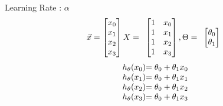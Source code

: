  Learning Rate : \( \alpha \)  \\

\[
	\vec{x} =
	\begin{bmatrix}
		x_0 \\
		x_1 \\
		x_2 \\
		x_3 \\
	\end{bmatrix}
	X = 
\begin{array}{ l@{} l@{} l@{} l@{} l@{}} 
\begin{bmatrix}
	1 & x_0 \\
	1 & x_1 \\
	1 & x_2 \\
	1 & x_3 \\
\end{bmatrix}
,
\Theta = 
	\begin{array}{ l@{} l@{} }
		\begin{bmatrix}
			\theta_0 \\
			\theta_1 \\
		\end{bmatrix} 
	\end{array}
\end{array}
\]
\[
	\begin{array}{ l@{} l@{} }
		h_{\theta}(x_0) &= \theta_{0} + \theta_{1}x_0  \\
		h_{\theta}(x_1) &= \theta_{0} + \theta_{1}x_1  \\
		h_{\theta}(x_2) &= \theta_{0} + \theta_{1}x_2  \\
		h_{\theta}(x_3) &= \theta_{0} + \theta_{1}x_3  \\
	\end{array}
\]
